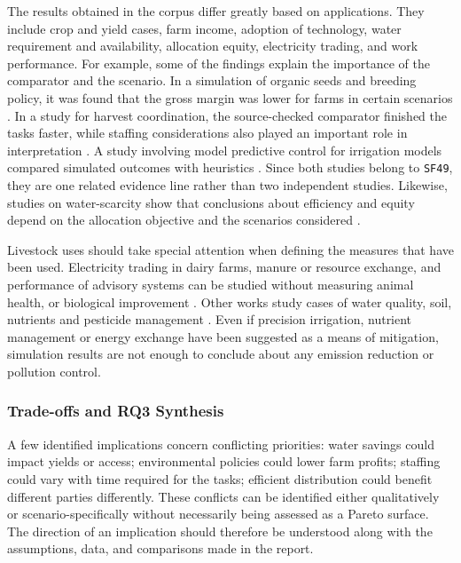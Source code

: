 \documentclass[11pt,a4paper]{article}
\begin{document}
The results obtained in the corpus differ greatly based on
applications. They include crop and yield cases, farm income, adoption
of technology, water requirement and availability, allocation equity,
electricity trading, and work performance. For example, some of the
findings explain the importance of the comparator and the scenario. In a
simulation of organic seeds and breeding policy, it was found that the gross
margin was lower for farms in certain scenarios \parencite{winter_assessing_2023}. In a study for harvest coordination, the source-checked comparator finished the tasks faster, while staffing considerations also played an important role in interpretation \parencite{harman_challenges_2023}. A study involving model predictive control for irrigation models compared simulated outcomes with heuristics \parencite{cobbenhagen_optimal_2022,schoonen_optimal_2019}.
Since both studies belong to \texttt{SF49}, they are one related evidence
line rather than two independent studies. Likewise, studies on water-scarcity  show that conclusions about efficiency and equity depend on the allocation objective and the scenarios considered \parencite{hung_assessing_2021,mahmoudian_adaptive_2025}.



Livestock uses should take special attention when defining
the measures that have been used. Electricity trading in dairy farms,
manure or resource exchange, and performance of advisory systems can be
studied without measuring animal health, or biological improvement
\parencite{shah_peer--peer_2024,shah_peer--peer_2026,
catarino_fostering_2021,t_shanteer_cownet-ai_2026}. Other works study
cases of water quality, soil, nutrients and pesticide management
\parencite{ng_agent-based_2011,quang_ex-ante_2014,
van_der_straeten_multi-agent_2010,grovermann_smart_2017}. Even if
precision irrigation, nutrient management or energy exchange have been
suggested as a means of mitigation, simulation results are not enough
to conclude about any emission reduction or pollution control.

\subsubsection{Trade-offs and RQ3 Synthesis}

A few identified implications concern conflicting priorities: water savings
could impact yields or access; environmental policies could lower
farm profits; staffing could vary with time required for the tasks;
efficient distribution could benefit different parties differently.
These conflicts can be identified either qualitatively or scenario-specifically
without necessarily being assessed as a Pareto surface. The
direction of an implication should therefore be understood along with
the assumptions, data, and comparisons made in the report.
\end{document}
